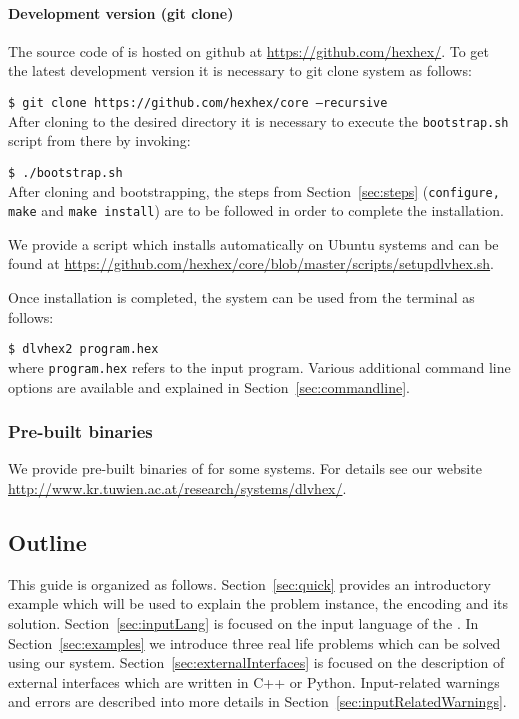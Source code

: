 \documentclass[a4paper, titlepage]{article}
\newcommand\leftaligned[1]{\par \smallskip #1 \smallskip\\}
\begin{document}
\paragraph{Development version (git clone)}
The source code of \dlvhex{} is hosted on github at 
\url{https://github.com/hexhex/}. To get the latest 
development version it is necessary to git clone system as 
follows:
%
\leftaligned{\texttt{\$ \thinspace
%
git clone 
https://github.com/hexhex/core --recursive}} 
After cloning to the desired directory it is necessary to 
execute the \texttt{bootstrap.sh} script from there by invoking:
%
\leftaligned{\texttt{\$ \thinspace ./bootstrap.sh}} 
%
After cloning and bootstrapping, the steps from 
Section~\ref{sec:steps} (\texttt{configure, make} and 
\texttt{make install}) are to be followed in order to 
complete the installation.

We provide a script which installs \dlvhex{} 
automatically on Ubuntu systems and can be found at 
\url{https://github.com/hexhex/core/blob/master/scripts/setupdlvhex.sh}.

Once installation is completed, the system can be used from 
the terminal as follows:
%
\leftaligned{\texttt{\$ \thinspace dlvhex2 program.hex}} 
%
where \texttt{program.hex} refers to the input program. Various 
additional command line options are available and explained in Section~\ref{sec:commandline}.    

\subsubsection{Pre-built binaries}
We provide pre-built binaries of \dlvhex{} for some 
systems. For details see our website 
\url{http://www.kr.tuwien.ac.at/research/systems/dlvhex/}. 

\subsection{Outline}
This guide is organized as follows. Section~\ref{sec:quick} 
provides an introductory example which will be used to 
explain the problem instance, the encoding and its 
solution. Section~\ref{sec:inputLang} is focused on the input 
language of the \dlvhex{}. In Section~\ref{sec:examples} we 
introduce three real life problems which can be solved 
using our system. Section~\ref{sec:externalInterfaces} is 
focused on the description of external interfaces which are 
written in C++ or Python. Input-related warnings and errors 
are described into more details in 
Section~\ref{sec:inputRelatedWarnings}.
\end{document}
